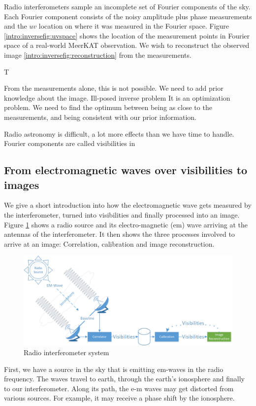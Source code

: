 Radio interferometers sample an incomplete set of Fourier components of the sky. Each Fourier component consists of the noisy amplitude plus phase measurements and the $uv$ location on where it was measured in the Fourier space. Figure \ref{intro:inversefig:uvspace} shows the location of the measurement points in Fourier space of a real-world MeerKAT observation. We wish to reconstruct the observed image \ref{intro:inversefig:reconstruction} from the measurements.

T

From the measurements alone, this is not possible. 
We need to add prior knowledge about the image.
Ill-posed inverse problem 
It is an optimization problem. We need to find the optimum between being as close to the measurements, and being consistent with our prior information.

Radio astronomy is difficult, a lot more effects than we have time to handle.
Fourier components are called visibilities in

\subsection{From electromagnetic waves over visibilities to images}
We give a short introduction into how the electromagnetic wave gets measured by the interferometer, turned into visibilities and finally processed into an image. Figure \ref{intro:system} shows a radio source and its electro-magnetic (em) wave arriving at the antennas of the interferometer. It then shows the three processes involved to arrive at an image: Correlation, calibration and image reconstruction.
	
\begin{figure}[h]
	\centering
	\includegraphics[width=0.80\linewidth]{./chapters/01.intro/system.png}
	\caption{Radio interferometer system}
	\label{intro:system}
\end{figure}

First, we have a source in the sky that is emitting em-waves in the radio frequency. The waves travel to earth, through the earth's ionosphere and finally to our interferometer. Along its path, the e-m waves may get distorted from various sources. For example, it may receive a phase shift by the ionosphere.

